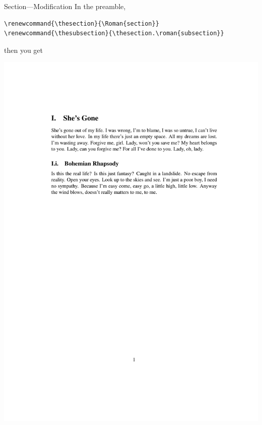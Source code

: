 \documentclass[12pt]{gshs_lecture}
\begin{document}
\begin{frame}[t,fragile]{Section---Modification}\small
In the preamble,
\begin{block}{}
\begin{lstlisting}
\renewcommand{\thesection}{\Roman{section}}
\renewcommand{\thesubsection}{\thesection.\roman{subsection}}
\end{lstlisting}
\end{block}
then you get
\begin{center}
\begin{framed}
\includegraphics[width=\textwidth,trim={0cm 18cm 0cm 4cm},clip]{./test_article/article005.pdf}
\end{framed}
\end{center}
\end{frame}
\end{document}

